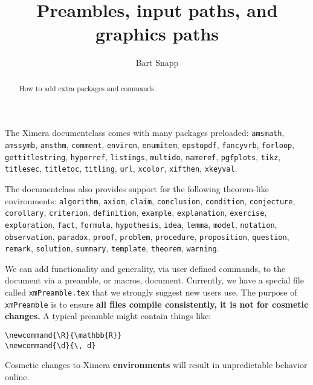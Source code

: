 \documentclass{ximera}
\title{Preambles, input paths, and graphics paths}
\author{Bart Snapp}
\begin{document}
\begin{abstract}
  How to add extra packages and commands.
\end{abstract}
\maketitle

The Ximera documentclass comes with many packages preloaded:
\verb!amsmath!,
\verb!amssymb!,
\verb!amsthm!,
\verb!comment!,
\verb!environ!,
\verb!enumitem!,
\verb!epstopdf!,
\verb!fancyvrb!,
\verb!forloop!,
\verb!gettitlestring!,
\verb!hyperref!,
\verb!listings!,
\verb!multido!,
\verb!nameref!,
\verb!pgfplots!,
\verb!tikz!,
\verb!titlesec!,
\verb!titletoc!,
\verb!titling!,
\verb!url!,
\verb!xcolor!,
\verb!xifthen!,
\verb!xkeyval!.


The documentclass also provides support for the following theorem-like
environments:
\verb!algorithm!, \verb!axiom!, \verb!claim!, \verb!conclusion!,
\verb!condition!, \verb!conjecture!, \verb!corollary!, \verb!criterion!,
\verb!definition!, \verb!example!, \verb!explanation!, \verb!exercise!,
\verb!exploration!,
\verb!fact!, \verb!formula!, \verb!hypothesis!, \verb!idea!, \verb!lemma!,
\verb!model!,
\verb!notation!, \verb!observation!, \verb!paradox!, \verb!proof!,
\verb!problem!,
\verb!procedure!,
\verb!proposition!, \verb!question!, \verb!remark!, \verb!solution!,
\verb!summary!, \verb!template!, \verb!theorem!, \verb!warning!.

We can add functionality and generality, via user defined commands, to the
document via a preamble, or macros, document. Currently, we have a special file
called \verb!xmPreamble.tex! that we strongly suggest new users use.
The purpose of \verb!xmPreamble! is to ensure \textbf{all files compile
  consistently,
  it is not for cosmetic changes.} A typical preamble might contain things
like:

\begin{verbatim}
\newcommand{\R}{\mathbb{R}}
\newcommand{\d}{\, d}
\end{verbatim}

\begin{warning}
  Cosmetic changes to Ximera \textbf{environments} will result in unpredictable
  behavior
  online.
\end{warning}
\end{document}

